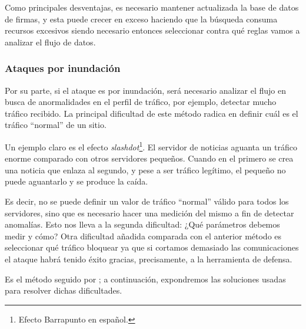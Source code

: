 Como principales desventajas, es necesario mantener actualizada la base de datos de firmas, y esta
puede crecer en exceso haciendo que la búsqueda consuma recursos excesivos siendo necesario entonces
seleccionar contra qué reglas vamos a analizar el flujo de datos.

\subsubsection{Ataques por inundación}\label{sssec:ddos_deteccion_inundacion}
Por su parte, si el ataque es por inundación, será necesario analizar el flujo en busca de anormalidades
en el perfil de tráfico, por ejemplo, detectar mucho tráfico recibido. La principal dificultad de este método radica
en definir cuál es el tráfico ``normal'' de un sitio.

Un ejemplo claro es el efecto \emph{slashdot}\footnote{Efecto Barrapunto en español.}. El servidor de noticias
aguanta un tráfico enorme comparado con otros servidores pequeños. Cuando en el primero se crea una noticia que
enlaza al segundo, y pese a ser tráfico legítimo, el pequeño no puede aguantarlo y se produce la caída.

Es decir, no se puede definir un valor de tráfico ``normal'' válido para todos los servidores, sino que es
necesario hacer una medición del mismo a fin de detectar anomalías. Esto nos lleva a la segunda dificultad:
¿Qué parámetros debemos medir y cómo? Otra dificultad añadida comparada con el anterior método es 
seleccionar qué tráfico bloquear ya
que si cortamos demasiado las comunicaciones el ataque habrá tenido éxito gracias, precisamente, a la herramienta de defensa.

Es el método seguido por \redborderddos; a continuación, expondremos las soluciones usadas para
resolver dichas dificultades.

\endinput
